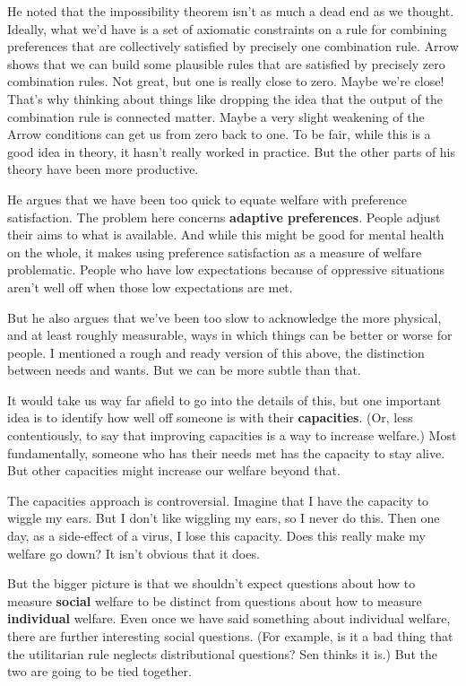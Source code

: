 He noted that the impossibility theorem isn't as much a dead end as we thought. Ideally, what we'd have is a set of axiomatic constraints on a rule for combining preferences that are collectively satisfied by precisely one combination rule. Arrow shows that we can build some plausible rules that are satisfied by precisely zero combination rules. Not great, but one is really close to zero. Maybe we're close! That's why thinking about things like dropping the idea that the output of the combination rule is connected matter. Maybe a very slight weakening of the Arrow conditions can get us from zero back to one. To be fair, while this is a good idea in theory, it hasn't really worked in practice. But the other parts of his theory have been more productive.

He argues that we have been too quick to equate welfare with preference satisfaction. The problem here concerns \textbf{adaptive preferences}. People adjust their aims to what is available. And while this might be good for mental health on the whole, it makes using preference satisfaction as a measure of welfare problematic. People who have low expectations because of oppressive situations aren't well off when those low expectations are met.

But he also argues that we've been too slow to acknowledge the more physical, and at least roughly measurable, ways in which things can be better or worse for people. I mentioned a rough and ready version of this above, the distinction between needs and wants. But we can be more subtle than that.

It would take us way far afield to go into the details of this, but one important idea is to identify how well off someone is with their \textbf{capacities}. (Or, less contentiously, to say that improving capacities is a way to increase welfare.) Most fundamentally, someone who has their needs met has the capacity to stay alive. But other capacities might increase our welfare beyond that.

The capacities approach is controversial. Imagine that I have the capacity to wiggle my ears. But I don't like wiggling my ears, so I never do this. Then one day, as a side-effect of a virus, I lose this capacity. Does this really make my welfare go down? It isn't obvious that it does.

But the bigger picture is that we shouldn't expect questions about how to measure \textbf{social} welfare to be distinct from questions about how to measure \textbf{individual} welfare. Even once we have said something about individual welfare, there are further interesting social questions. (For example, is it a bad thing that the utilitarian rule neglects distributional questions? Sen thinks it is.) But the two are going to be tied together.


